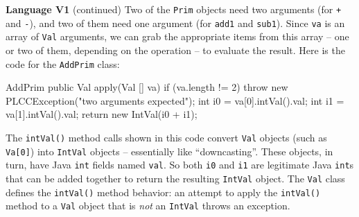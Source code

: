 \begin{minipage}[t]{\sw}
\slidenumber
\LARGE
{\bf Language V1} (continued)\exx
Two of the \verb'Prim' objects need two arguments
(for \verb'+' and \verb'-'),
and two of them need one argument
(for \verb'add1' and \verb'sub1').
Since \verb'va' is an array of \verb'Val' arguments,
we can grab the appropriate items from this array --
one or two of them, depending on the operation --
to evaluate the result.
Here is the code for the \verb'AddPrim' class:
{\Large
\begin{qv}
AddPrim
    public Val apply(Val [] va) {
        if (va.length != 2)
            throw new PLCCException("two arguments expected");
        int i0 = va[0].intVal().val;
        int i1 = va[1].intVal().val;
        return new IntVal(i0 + i1);
    }
\end{qv}
}
The \verb'intVal()' method calls shown in this
code convert \verb'Val' objects (such as \verb'Va[0]')
into \verb'IntVal' objects -- essentially like ``downcasting''.
These objects, in turn, have Java \verb'int' fields named \verb'val'.
So both \verb'i0' and \verb'i1' are legitimate Java \verb'int's
that can be added together to return the resulting \verb'IntVal' object.
The \verb'Val' class defines the \verb'intVal()' method behavior:
an attempt to apply the \verb'intVal()' method
to a \verb'Val' object that is {\em not} an \verb'IntVal'
throws an exception.
\end{minipage}
\clearpage
